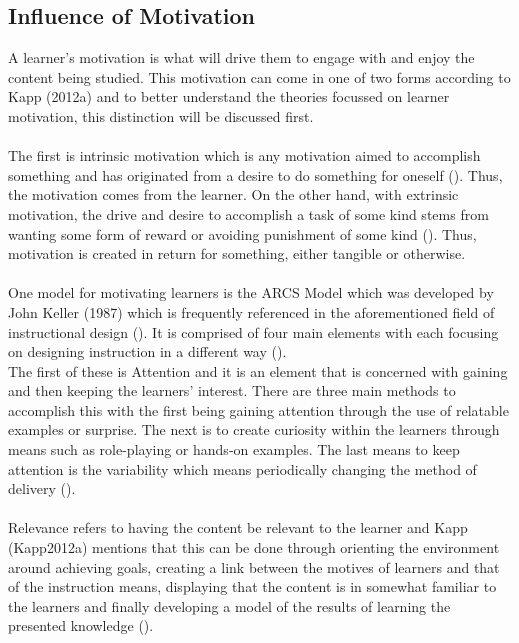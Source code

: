 \subsection{Influence of Motivation}
A learner's motivation is what will drive them to engage with and enjoy the content being studied. This motivation can come in one of two forms according to Kapp (2012a) and to better understand the theories focussed on learner motivation, this distinction will be discussed first.
\\\\
The first is intrinsic motivation which is any motivation aimed to accomplish something and has originated from a desire to do something for oneself (\cite{Kapp2012a}). Thus, the motivation comes from the learner. On the other hand, with extrinsic motivation, the drive and desire to accomplish a task of some kind stems from wanting some form of reward or avoiding punishment of some kind (\cite{Kapp2012a}). Thus, motivation is created in return for something, either tangible or otherwise. 
\\\\
One model for motivating learners is the ARCS Model which was developed by John Keller (1987) which is frequently referenced in the aforementioned field of instructional design (\cite{Kapp2012a}). It is comprised of four main elements with each focusing on designing instruction in a different way (\cite{Kapp2012a, keller1987development}). 
\\
The first of these is Attention and it is an element that is concerned with gaining and then keeping the learners’ interest. There are three main methods to accomplish this with the first being gaining attention through the use of relatable examples or surprise. The next is to create curiosity within the learners through means such as role-playing or hands-on examples. The last means to keep attention is the variability which means periodically changing the method of delivery (\cite{Kapp2012a, keller1987development}).
\\\\
Relevance refers to having the content be relevant to the learner and Kapp (Kapp2012a) mentions that this can be done through orienting the environment around achieving goals, creating a link between the motives of learners and that of the instruction means, displaying that the content is in somewhat familiar to the learners and finally developing a model of the results of learning the presented knowledge (\cite{keller1987development}).
\\\\
